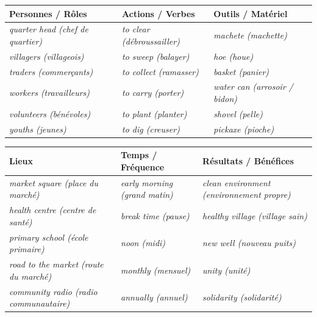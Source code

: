 \documentclass[11pt]{article}
\newcommand{\eng}[1]{\ifmmode\text{\textit{#1}}\else\begingroup\selectlanguage{english}\itshape #1\endgroup\fi}
\begin{document}
\begin{definition}
\begin{center}
\begin{tabularx}{\linewidth}{|l|X|l|}
\hline
\rowcolor{popblueL} \textbf{Personnes / Rôles} & \textbf{Actions / Verbes} & \textbf{Outils / Matériel} \\
\hline
\eng{quarter head} (chef de quartier) & \eng{to clear} (débroussailler) & \eng{machete} (machette) \\
\eng{villagers} (villageois) & \eng{to sweep} (balayer) & \eng{hoe} (houe) \\
\eng{traders} (commerçants) & \eng{to collect} (ramasser) & \eng{basket} (panier) \\
\eng{workers} (travailleurs) & \eng{to carry} (porter) & \eng{water can} (arrosoir / bidon) \\
\eng{volunteers} (bénévoles) & \eng{to plant} (planter) & \eng{shovel} (pelle) \\
\eng{youths} (jeunes) & \eng{to dig} (creuser) & \eng{pickaxe} (pioche) \\
\hline
\end{tabularx}
\end{center}
\vspace{0.3cm}
\begin{center}
\begin{tabularx}{\linewidth}{|l|X|l|}
\hline
\rowcolor{popgreenL} \textbf{Lieux} & \textbf{Temps / Fréquence} & \textbf{Résultats / Bénéfices} \\
\hline
\eng{market square} (place du marché) & \eng{early morning} (grand matin) & \eng{clean environment} (environnement propre) \\
\eng{health centre} (centre de santé) & \eng{break time} (pause) & \eng{healthy village} (village sain) \\
\eng{primary school} (école primaire) & \eng{noon} (midi) & \eng{new well} (nouveau puits) \\
\eng{road to the market} (route du marché) & \eng{monthly} (mensuel) & \eng{unity} (unité) \\
\eng{community radio} (radio communautaire) & \eng{annually} (annuel) & \eng{solidarity} (solidarité) \\
\hline
\end{tabularx}
\end{center}
\end{definition}
\end{document}
